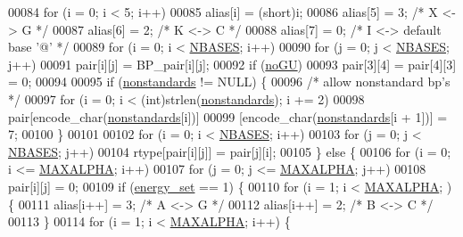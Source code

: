 \begin{DoxyCode}
00084     \textcolor{keywordflow}{for} (i = 0; i < 5; i++)
00085       alias[i] = (\textcolor{keywordtype}{short})i;
00086     alias[5]  = 3;  \textcolor{comment}{/* X <-> G */}
00087     alias[6]  = 2;  \textcolor{comment}{/* K <-> C */}
00088     alias[7]  = 0;  \textcolor{comment}{/* I <-> default base '@' */}
00089     \textcolor{keywordflow}{for} (i = 0; i < \mbox{\hyperlink{pair__mat_8h_ad554b4852cd5fec35025db8edbbba3cd}{NBASES}}; i++)
00090       \textcolor{keywordflow}{for} (j = 0; j < \mbox{\hyperlink{pair__mat_8h_ad554b4852cd5fec35025db8edbbba3cd}{NBASES}}; j++)
00091         pair[i][j] = BP\_pair[i][j];
00092     \textcolor{keywordflow}{if} (\mbox{\hyperlink{group__model__details_gabf380d09e4f1ab94fc6af57cf0ad5d32}{noGU}})
00093       pair[3][4] = pair[4][3] = 0;
00094 
00095     \textcolor{keywordflow}{if} (\mbox{\hyperlink{pair__mat_8h_a2695d91cc535d09c2eae5c3884e2ec64}{nonstandards}} != NULL) \{
00096       \textcolor{comment}{/* allow nonstandard bp's */}
00097       \textcolor{keywordflow}{for} (i = 0; i < (int)strlen(\mbox{\hyperlink{pair__mat_8h_a2695d91cc535d09c2eae5c3884e2ec64}{nonstandards}}); i += 2)
00098         pair[encode\_char(\mbox{\hyperlink{pair__mat_8h_a2695d91cc535d09c2eae5c3884e2ec64}{nonstandards}}[i])]
00099         [encode\_char(\mbox{\hyperlink{pair__mat_8h_a2695d91cc535d09c2eae5c3884e2ec64}{nonstandards}}[i + 1])] = 7;
00100     \}
00101 
00102     \textcolor{keywordflow}{for} (i = 0; i < \mbox{\hyperlink{pair__mat_8h_ad554b4852cd5fec35025db8edbbba3cd}{NBASES}}; i++)
00103       \textcolor{keywordflow}{for} (j = 0; j < \mbox{\hyperlink{pair__mat_8h_ad554b4852cd5fec35025db8edbbba3cd}{NBASES}}; j++)
00104         rtype[pair[i][j]] = pair[j][i];
00105   \} \textcolor{keywordflow}{else} \{
00106     \textcolor{keywordflow}{for} (i = 0; i <= \mbox{\hyperlink{pair__mat_8h_a05a5ffe718aa431d97419a12fb082379}{MAXALPHA}}; i++)
00107       \textcolor{keywordflow}{for} (j = 0; j <= \mbox{\hyperlink{pair__mat_8h_a05a5ffe718aa431d97419a12fb082379}{MAXALPHA}}; j++)
00108         pair[i][j] = 0;
00109     \textcolor{keywordflow}{if} (\mbox{\hyperlink{group__model__details_gafb1ef1166da85092ae8a325e02dcae71}{energy\_set}} == 1) \{
00110       \textcolor{keywordflow}{for} (i = 1; i < \mbox{\hyperlink{pair__mat_8h_a05a5ffe718aa431d97419a12fb082379}{MAXALPHA}}; ) \{
00111         alias[i++]  = 3;      \textcolor{comment}{/* A <-> G */}
00112         alias[i++]  = 2;      \textcolor{comment}{/* B <-> C */}
00113       \}
00114       \textcolor{keywordflow}{for} (i = 1; i < \mbox{\hyperlink{pair__mat_8h_a05a5ffe718aa431d97419a12fb082379}{MAXALPHA}}; i++) \{

\end{DoxyCode}
